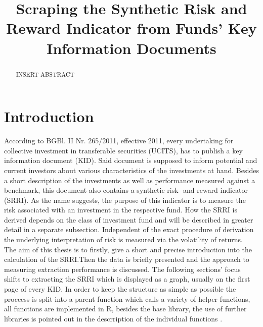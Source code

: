 \documentclass[aodsor,preprint]{imsart}
\numberwithin{equation}{section}
\theoremstyle{plain}
\begin{document}
\begin{frontmatter}
\title{Scraping the Synthetic Risk and Reward Indicator from Funds' Key Information Documents}

\begin{aug}
\author{ }





\end{aug}

\begin{abstract}
INSERT ABSTRACT
\end{abstract}

\begin{keyword}[class=MSC]
\end{keyword}

\begin{keyword}
\kwd{\LaTeXe}
\end{keyword}

\end{frontmatter}

\section{Introduction}
According to BGBl. II Nr. 265/2011, effective 2011, every undertaking for collective investment in transferable securities (UCITS), has to publish a key information document (KID)\citep{BGB1}. Said document is supposed to inform potential and current investors about various characteristics of the investments at hand. Besides a short description of the investments as well as performance measured against a benchmark, this document also contains a synthetic risk- and reward indicator (SRRI). As the name suggests, the purpose of this indicator is to measure the risk associated with an investment in the respective fund. How the SRRI is derived depends on the class of investment fund and will be described in greater detail in a separate subsection. Independent of the exact procedure of derivation the underlying interpretation of risk is measured via the volatility of returns.\\
The aim of this thesis is to firstly, give a short and precise introduction into the calculation of the SRRI.Then the data is briefly presented and the approach to measuring extraction performance is discussed. The following sections' focus shifts to extracting the SRRI which is displayed as a graph, usually on the first page of every KID. In order to keep the structure as simple as possible the proccess is split into a parent function which calls a variety of helper functions, all functions are implemented in R, besides the base library, the use of further libraries is pointed out in the descrription of the individual functions \citep{base}.
\end{document}
